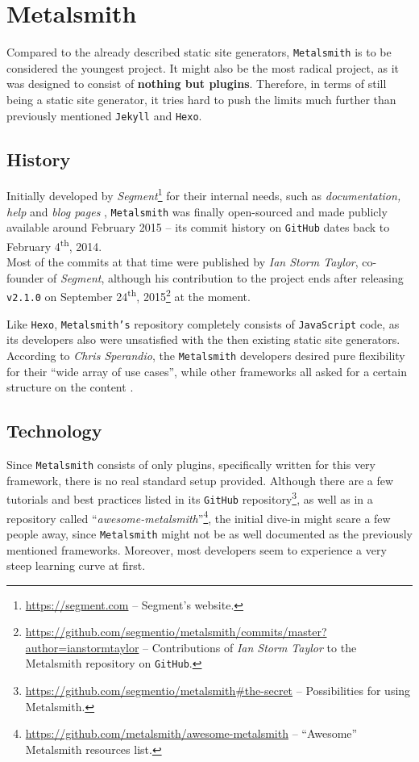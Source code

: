 \section{Metalsmith}
\label{sec:metalsmith}

Compared to the already described static site generators, \texttt{Metalsmith} is to be considered the youngest project.
It might also be the most radical project, as it was designed to consist of \textbf{nothing but plugins}. Therefore, in terms of still being a static site generator, it tries hard to push the limits much further than previously mentioned \texttt{Jekyll} and \texttt{Hexo}.

\subsection{History}
\label{sec:metalsmith-history}
Initially developed by \emph{Segment}\footnote{\url{https://segment.com} -- Segment's website.} for their internal needs, such as \emph{documentation, help} and \emph{blog pages} \cite{Metalsmith2015buildingblocks}, \texttt{Metalsmith} was finally open-sourced and made publicly available around February 2015 -- its commit history on \texttt{GitHub} dates back to February 4\textsuperscript{th}, 2014.\\
Most of the commits at that time were published by \emph{Ian Storm Taylor}, co-founder of \emph{Segment}, although his contribution to the project ends after releasing \texttt{v2.1.0} on September 24\textsuperscript{th}, 2015\footnote{\url{https://github.com/segmentio/metalsmith/commits/master?author=ianstormtaylor} -- Contributions of \emph{Ian Storm Taylor} to the Metalsmith repository on \texttt{GitHub}.} at the moment.

Like \texttt{Hexo}, \texttt{Metalsmith's} repository completely consists of \texttt{JavaScript} code, as its developers also were unsatisfied with the then existing static site generators. According to \emph{Chris Sperandio}, the \texttt{Metalsmith} developers desired pure flexibility for their ``wide array of use cases'', while other frameworks all asked for a certain structure on the content \cite{Metalsmith2015buildingblocks}.

\subsection{Technology}
\label{sec:metalsmith-technology}
Since \texttt{Metalsmith} consists of only plugins, specifically written for this very framework, there is no real standard setup provided. Although there are a few tutorials and best practices listed in its \texttt{GitHub} repository\footnote{\url{https://github.com/segmentio/metalsmith\#the-secret} -- Possibilities for using Metalsmith.}, as well as in a repository called ``\emph{awesome-metalsmith}''\footnote{\url{https://github.com/metalsmith/awesome-metalsmith} -- ``Awesome'' Metalsmith resources list.}, the initial dive-in might scare a few people away, since \texttt{Metalsmith} might not be as well documented as the previously mentioned frameworks. Moreover, most developers seem to experience a very steep learning curve at first.

